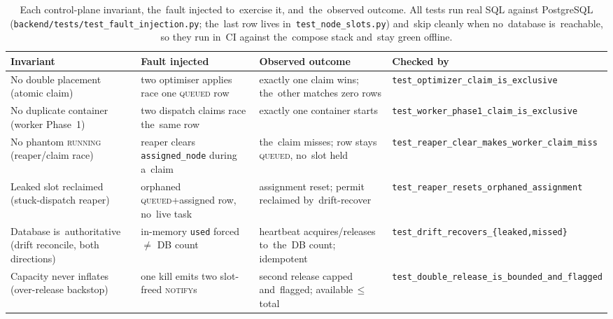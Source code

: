 \begin{table}[H]\centering\scriptsize\setlength{\tabcolsep}{3pt}
\renewcommand{\arraystretch}{1.2}%
\begin{tabularx}{\textwidth}{@{}>{\raggedright\arraybackslash}p{2.9cm} >{\raggedright\arraybackslash}X >{\raggedright\arraybackslash}X >{\raggedright\arraybackslash}p{3.5cm}@{}}\toprule
Invariant & Fault injected & Observed outcome & Checked by \\\midrule
No double placement (atomic claim) & two optimiser applies race one \textsc{queued} row & exactly one claim wins; the~other matches zero rows & \texttt{test\_optimizer\_\newline claim\_is\_exclusive} \\\addlinespace
No duplicate container (worker Phase~1) & two dispatch claims race the~same row & exactly one container starts & \texttt{test\_worker\_phase1\_\newline claim\_is\_exclusive} \\\addlinespace
No phantom \textsc{running} (reaper/claim race) & reaper clears \texttt{assigned\_node} during a~claim & the~claim misses; row stays \textsc{queued}, no~slot held & \texttt{test\_reaper\_clear\_\newline makes\_worker\_claim\_miss} \\\addlinespace
Leaked slot reclaimed (stuck-dispatch reaper) & orphaned \textsc{queued}+assigned row, no~live task & assignment reset; permit reclaimed by~drift-recover & \texttt{test\_reaper\_resets\_\newline orphaned\_assignment} \\\addlinespace
Database is~authoritative (drift reconcile, both directions) & in-memory \texttt{used} forced $\neq$ DB count & heartbeat acquires/releases to~the~DB count; idempotent & \texttt{test\_drift\_recovers\_\newline \{leaked,missed\}} \\\addlinespace
Capacity never inflates (over-release backstop) & one kill emits two slot-freed \textsc{notify}s & second release capped and~flagged; available\,$\le$\,total & \texttt{test\_double\_release\_\newline is\_bounded\_and\_flagged} \\\bottomrule
\end{tabularx}
\caption{Each control-plane invariant, the~fault injected to~exercise it,
and~the~observed outcome.  All tests run real SQL against PostgreSQL
(\texttt{backend/tests/test\_fault\_injection.py}; the~last row lives
in~\texttt{test\_node\_slots.py}) and~skip cleanly when no~database
is~reachable, so they run in~CI against the~compose stack and~stay green
offline.}\label{tab:fault-evidence}
\end{table}

